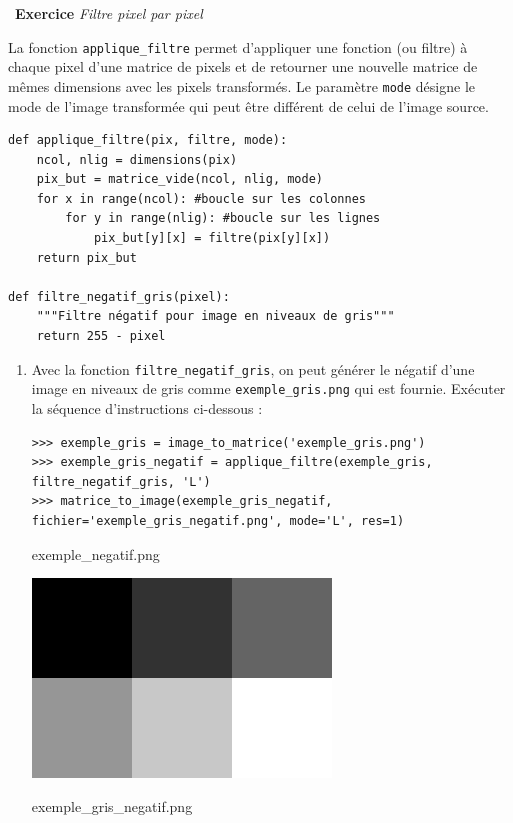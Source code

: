 \documentclass[a4paper, french, 12pt]{article}
\newcounter{exo}
\newenvironment{exercice}[1]
{\par \medskip   \addtocounter{exo}{1} \noindent  
\begin{bclogo}[arrondi =0.1,   noborder = true, logo=\bccrayon, marge=4]{~\textbf{Exercice} \textbf{\theexo} {\itshape #1} }  \par}
{
\end{bclogo}
 \par \bigskip }
\newcounter{def}
\begin{document}
\begin{exercice}{Filtre pixel par pixel}

La fonction \texttt{applique\_filtre} permet d'appliquer une fonction (ou filtre) à chaque pixel d'une matrice de pixels et de retourner une nouvelle matrice de mêmes dimensions avec les pixels transformés. Le paramètre \texttt{mode} désigne le mode de l'image transformée qui peut être différent de celui de l'image source.

\begin{lstlisting}[style=rond]
def applique_filtre(pix, filtre, mode):
    ncol, nlig = dimensions(pix)
    pix_but = matrice_vide(ncol, nlig, mode)
    for x in range(ncol): #boucle sur les colonnes
        for y in range(nlig): #boucle sur les lignes
            pix_but[y][x] = filtre(pix[y][x])
    return pix_but

def filtre_negatif_gris(pixel):
    """Filtre négatif pour image en niveaux de gris"""
    return 255 - pixel
\end{lstlisting} 


\begin{enumerate}
	\item Avec la fonction \texttt{filtre\_negatif\_gris}, on peut générer le négatif d'une image en niveaux de gris comme \texttt{exemple\_gris.png} qui est fournie. Exécuter la séquence d'instructions ci-dessous :

\begin{lstlisting}[style=compil]
>>> exemple_gris = image_to_matrice('exemple_gris.png')
>>> exemple_gris_negatif = applique_filtre(exemple_gris, filtre_negatif_gris, 'L')
>>> matrice_to_image(exemple_gris_negatif, fichier='exemple_gris_negatif.png', mode='L', res=1)
\end{lstlisting}

\begin{minipage}{0.45\linewidth}

\begin{center}
exemple\_negatif.png

\medskip

\includegraphics[scale=0.5]{images/exemple_gris.png}
\end{center}
\end{minipage}\hfill
\begin{minipage}{0.45\linewidth}
\begin{center}
exemple\_gris\_negatif.png


\end{center}
\end{minipage}
\end{enumerate}
\end{exercice}
\end{document}
